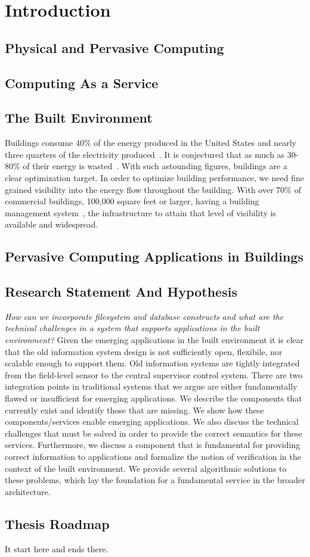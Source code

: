 \chapter{Introduction}

\section{Physical and Pervasive Computing}
\section{Computing As a Service}
\section{The Built Environment}
Buildings consume 40\% of the energy produced in the United States and nearly three quarters of 
the electricity produced~\cite{epabuildings}.  It is conjectured that as much as 30-80\% of their energy is 
wasted~\cite{waste_science, next10_waste}.  With such astounding figures, buildings are a clear optimization
target.  In order to optimize building performance, we need fine grained visibility into the energy flow
throughout the building.  With over 70\% of commercial buildings, 100,000 square feet or 
larger, having a building management system~\cite{cbecs2003}, the infrastructure to attain that level of 
visibility is available and widespread.  

\section{Pervasive Computing Applications in Buildings}
\section{Research Statement And Hypothesis}
\emph{How can we incorporate filesystem and database constructs and what are the technical challenges in a system that supports applications
in the built environment?}
Given the emerging applications in
the built environment it is clear that the old information system design is not sufficiently open, flexibile, nor
scalable enough to support them.  Old information systems are tightly integrated from the field-level sensor to
the central supervisor control system.  There are two integration points in traditional systems that we argue 
are either fundamentally flawed or insufficient for emerging applications.  We describe the components that 
currently exist and identify those that are missing.  We show how these components/services enable emerging applications.  We also
discuss the technical challenges that must be solved in order to provide the correct semantics for these services.
Furthermore, we discuss a component that is fundamental for providing correct information to applications 
and formalize the notion of verification in the context of the built environment.  We provide several algorithmic 
solutions to these problems, which lay the foundation for a fundamental service in the broader architecture.

\section{Thesis Roadmap}
It start here and ends there.